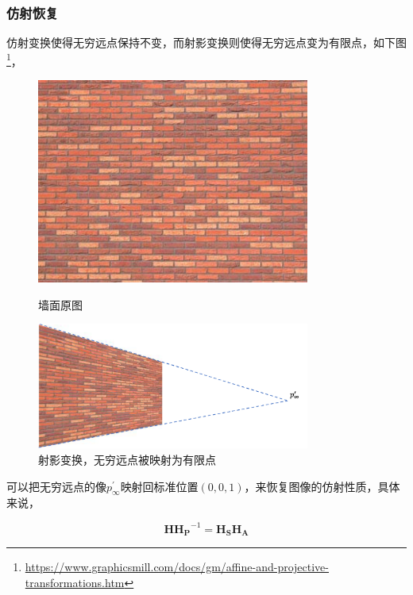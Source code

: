 \documentclass[hpyerref,UTF8,a4paper,titlepage,12pt,oneside]{ctexbook}
\theoremstyle{definition}
\begin{document}
	\subsubsection{仿射恢复}

		仿射变换使得无穷远点保持不变，而射影变换则使得无穷远点变为有限点，如下图\footnote{\url{https://www.graphicsmill.com/docs/gm/affine-and-projective-transformations.htm}}，

		\begin{figure}[H]
			\begin{minipage}[t]{0.52\linewidth}
				\centering
				\includegraphics[width=0.8\textwidth]{../images/origin_.jpeg}
				\caption{墙面原图}
			\end{minipage}
			\begin{minipage}[t]{0.78\linewidth}
				\centering
				\includegraphics[width=0.8\textwidth]{../images/projective_.png}
				\caption{射影变换，无穷远点被映射为有限点}
			\end{minipage}			
		\end{figure}

		可以把无穷远点的像$p^{\prime}_{\infty}$映射回标准位置$(0,0,1)$，来恢复图像的仿射性质，具体来说，

		$$
			\mathbf{H}\mathbf{H_P}^{-1} = \mathbf{H_S}\mathbf{H_A}
		$$
\end{document}
